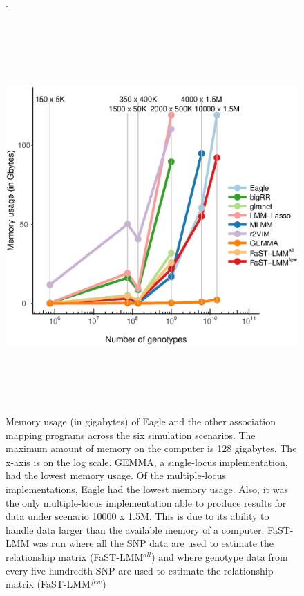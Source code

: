 \documentclass{article}
\begin{document}
\begin{figure}
\caption{Memory usage (in gigabytes) of Eagle and the other association mapping programs across 
the six simulation scenarios. The maximum amount of memory on the computer is 128 gigabytes. 
The x-axis is on the log scale. GEMMA, a single-locus implementation, had the lowest memory usage. 
Of the multiple-locus implementations, Eagle had the lowest memory usage. Also, it 
was the only multiple-locus 
implementation able to produce results for data under  scenario 10000 x 1.5M. This is due to its ability 
to handle data larger than the available memory of a computer. FaST-LMM was run where all the SNP data are used 
to estimate the relationship matrix (FaST-LMM$^{all}$)   and where genotype data from every five-hundredth SNP are used to 
estimate the relationship matrix (FaST-LMM$^{few}$)}.
\begin{center}
\includegraphics[width=15cm, height=15cm]{mem.eps}
\end{center}
\end{figure}
\end{document}
